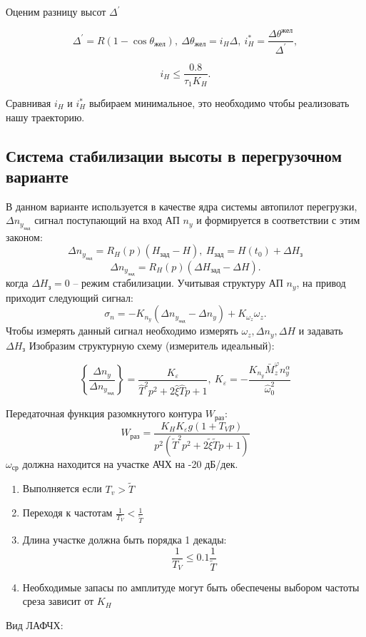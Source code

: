 \documentclass{article}
\begin{document}
Оценим разницу высот $\Delta^{'}$

\[
	\Delta^{'} = R(1 - \cos{\theta_\text{жел}}), \ \Delta \theta_\text{жел} =
	i_H \Delta, \ i_{H}^* = \frac{\Delta \theta^\text{жел}}{\Delta^{'}},
\]

\[
	i_H \le \frac{0.8}{\tau_1 K_H}
	.\]

Сравнивая $i_H$ и $i_H^*$ выбираем минимальное, это необходимо чтобы
реализовать нашу траекторию.

\subsection{Система стабилизации высоты в перегрузочном варианте}
В данном варианте используется в качестве ядра системы автопилот перегрузки, $
	\Delta n_{y_\text{зад}}$ сигнал поступающий на вход АП $n_y$ и формируется в
соответствии с этим законом:
\[
	\Delta n_{y_\text{зад}} = R_H(p) (H_\text{зад} - H), \ H_\text{зад} =
	H(t_0) + \Delta H_\text{з}
\]
\[
	\Delta n_{y_\text{зад}} = R_H(p) (\Delta H_\text{зад} - \Delta H)
	.\]
когда $\Delta H_\text{з} = 0$ -- режим стабилизации. Учитывая структуру АП
$n_y$, на привод приходит следующий сигнал:
\[
	\sigma_n = -K_{n_y} ( \Delta n_{y_\text{зад}} - \Delta n_y) + K_{\omega_z}
	\omega_z
	.\]
Чтобы измерять данный сигнал необходимо измерять $\omega_z, \Delta n_y, \Delta
	H$ и задавать $\Delta H_\text{з}$
Изобразим структурную схему (измеритель идеальный):
\begin{figure}[H]
	\centering
	\label{fig:fig_44}
\end{figure}
\[
	\left\{ \frac{ \Delta n_y}{ \Delta n_{y_\text{зад}}} \right\}  =
	\frac{K_\varepsilon}{ \hat{T}^2 p^2 + 2 \hat{\xi} \hat{T}p + 1 }, \
	K_\varepsilon = - \frac{K_{n_y} \bar{M}_z^{\varphi} n_y^\alpha
	}{\hat{\omega}_0^2}
\]

Передаточная функция разомкнутого контура $W_\text{раз}$:
\[
	W_\text{раз}  = \frac{K_H K_\varepsilon g (1 + T_V p)}{p^2 (\tilde{T}^2 p^2
		+ 2 \tilde{\xi} \tilde{T}p + 1)}
\]
$\omega_\text{ср}$ должна находится на участке АЧХ на -20 дБ/дек.
\begin{enumerate}
	\item Выполняется если $T_v > \tilde{T}$
	\item Переходя к частотам $\frac{1}{T_V} < \frac{1}{\tilde{T}}$
	\item Длина участке должна быть порядка 1 декады:
	      \[
		      \frac{1}{T_V} \le 0.1 \frac{1}{\tilde{T}}
	      \]
	\item Необходимые запасы по амплитуде могут быть обеспечены выбором частоты
	      среза зависит от $K_H$
\end{enumerate}
Вид ЛАФЧХ:
\begin{figure}[H]
	\centering
	\label{fig:fig_45}
\end{figure}
\end{document}
